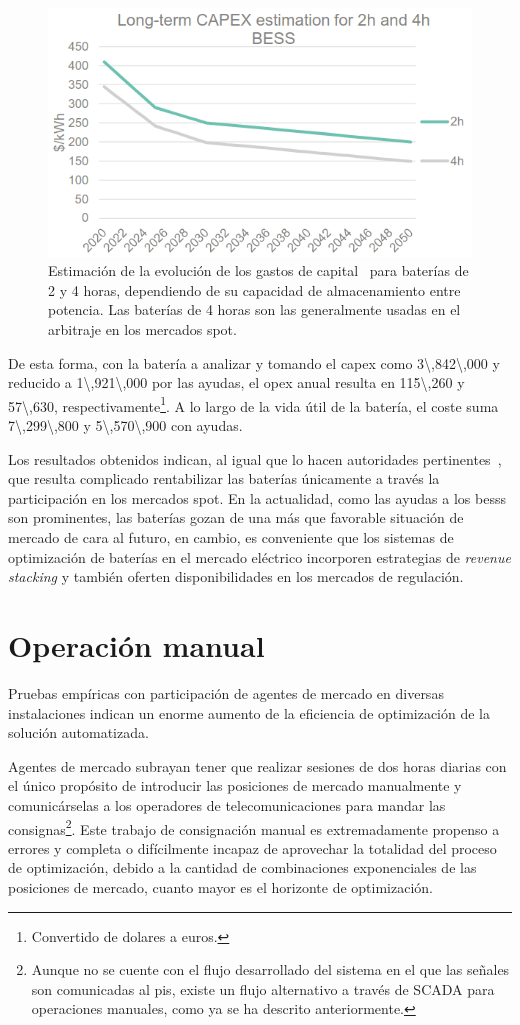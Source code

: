 \begin{figure}
  \centering
  \includegraphics[width=0.5\linewidth]{figures/capex-bateria.png}
  \caption[Estimación de la evolución de los gastos de capital.]{Estimación de la evolución de los gastos de capital~\cite{national2025nrel} para baterías de 2 y 4 horas, dependiendo de su capacidad de almacenamiento entre potencia. Las baterías de 4 horas son las generalmente usadas en el arbitraje en los mercados spot.}%
  \label{fig:capex-bateria}
\end{figure}

De esta forma, con la batería a analizar y tomando el \gls{capex} como \SI{3\,842\,000}{\text{\euro}} y reducido a \SI{1\,921\,000}{\text{\euro}} por las ayudas, el \gls{opex} anual resulta en \SI{115\,260}{\text{\euro}} y \SI{57\,630}{\text{\euro}}, respectivamente\footnote{Convertido de dolares a euros.}. A lo largo de la vida útil de la batería, el coste suma \SI{7\,299\,800}{\text{\euro}} y \SI{5\,570\,900}{\text{\euro}} con ayudas.

Los resultados obtenidos indican, al igual que lo hacen autoridades pertinentes~\cite{gadvisory2025technical}, que resulta complicado rentabilizar las baterías únicamente a través la participación en los mercados spot. En la actualidad, como las ayudas a los \glspl{bess} son prominentes, las baterías gozan de una más que favorable situación de mercado de cara al futuro, en cambio, es conveniente que los sistemas de optimización de baterías en el mercado eléctrico incorporen estrategias de \textit{revenue stacking} y también oferten disponibilidades en los mercados de regulación.

\section{Operación manual}%
\label{makereference7.2}

Pruebas empíricas con participación de agentes de mercado en diversas instalaciones indican un enorme aumento de la eficiencia de optimización de la solución automatizada.

Agentes de mercado subrayan tener que realizar sesiones de dos horas diarias con el único propósito de introducir las posiciones de mercado manualmente y comunicárselas a los operadores de telecomunicaciones para mandar las consignas\footnote{Aunque no se cuente con el flujo desarrollado del sistema en el que las señales son comunicadas al \gls{pis}, existe un flujo alternativo a través de SCADA para operaciones manuales, como ya se ha descrito anteriormente.}. Este trabajo de consignación manual es extremadamente propenso a errores y completa o difícilmente incapaz de aprovechar la totalidad del proceso de optimización, debido a la cantidad de combinaciones exponenciales de las posiciones de mercado, cuanto mayor es el horizonte de optimización.

